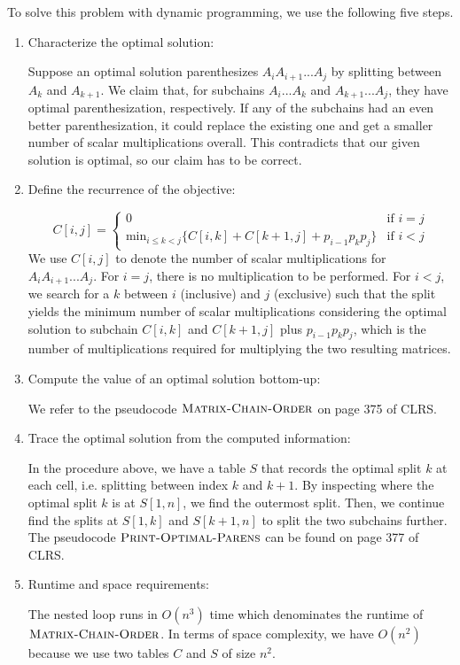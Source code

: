 \documentclass[11pt]{article}
\theoremstyle{definition}
\theoremstyle{theorem}
\begin{document}
To solve this problem with dynamic programming, we use the following five steps.
\begin{enumerate}[label=(\arabic*)]
\item Characterize the optimal solution:

Suppose an optimal solution parenthesizes $A_iA_{i+1}...A_j$ by splitting between $A_k$ and $A_{k+1}$. We claim that, for subchains $A_i...A_k$ and $A_{k+1}...A_j$, they have optimal parenthesization, respectively. If any of the subchains had an even better parenthesization, it could replace the existing one and get a smaller number of scalar multiplications overall. This contradicts that our given solution is optimal, so our claim has to be correct.

\item Define the recurrence of the objective:

\[
C[i, j] = 
\begin{cases}
  0 												&\mbox{if } i = j \\
  \text{min}_{i \le k < j} \{C[i, k] + C[k+1, j] + p_{i-1} p_k p_j\} 	&\mbox{if } i < j 
\end{cases}
\]
We use $C[i, j]$ to denote the number of scalar multiplications for $A_iA_{i+1}...A_j$. For $i = j$, there is no multiplication to be performed. For $i < j$, we search for a $k$ between $i$ (inclusive) and $j$ (exclusive) such that the split yields the minimum number of scalar multiplications considering the optimal solution to subchain $C[i, k]$ and $C[k+1, j]$ plus $p_{i-1}p_kp_j$, which is the number of multiplications required for multiplying the two resulting matrices.

\item Compute the value of an optimal solution bottom-up:

We refer to the pseudocode $\textproc{\textsc{Matrix-Chain-Order}}$ on page 375 of CLRS.

\item Trace the optimal solution from the computed information:

In the procedure above, we have a table $S$ that records the optimal split $k$ at each cell, i.e. splitting between index $k$ and $k+1$. By inspecting where the optimal split $k$ is at $S[1, n]$, we find the outermost split. Then, we continue find the splits at $S[1, k]$ and $S[k+1, n]$ to split the two subchains further. The pseudocode $\textproc{\textsc{Print-Optimal-Parens}}$ can be found on page 377 of CLRS.

\item Runtime and space requirements:

The nested loop runs in $O(n^3)$ time which denominates the runtime of $\textproc{\textsc{Matrix-Chain-Order}}$. In terms of space complexity, we have $O(n^2)$ because we use two tables $C$ and $S$ of size $n^2$. 
\end{enumerate}
\end{document}
